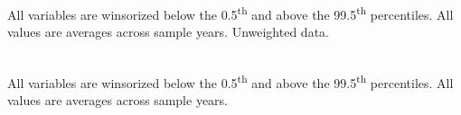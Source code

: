 \documentclass[12pt,notitlepage]{article}
\begin{document}
\begin{table}[!htpb]
\caption{Unweighted French Summary Statistics}
\tabularnewline \\
All variables are winsorized below the 0.5\textsuperscript{th} and above the 99.5\textsuperscript{th} percentiles. All values are averages across sample years. Unweighted data. 
\end{table}

\begin{table}[!htpb]
\caption{Unweighted French Summary Statistics}
 \\
All variables are winsorized below the 0.5\textsuperscript{th} and above the 99.5\textsuperscript{th} percentiles. All values are averages across sample years.
\end{table}





\end{document}
